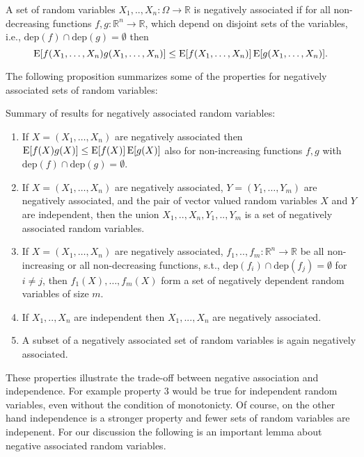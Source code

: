 \begin{definition}\label{def:neg_assoc}
A set of random variables $X_1,..,X_n: \Omega \rightarrow \mathbb R$ is negatively associated if for all non-decreasing functions $f,g: \mathbb R^n \rightarrow \mathbb R$, which depend on disjoint sets of the variables, i.e., $\mathrm{dep}(f) \cap \mathrm{dep}(g) = \emptyset$ then
\[
\operatorname{\mathrm{E}} [f(X_1,\ldots,X_n) g(X_1,\ldots,X_n)] \leq \operatorname{\mathrm{E}} [f(X_1,\ldots,X_n)] \operatorname{\mathrm{E}} [g(X_1,\ldots,X_n)] \textrm{.}
\]
\end{definition}

The following proposition summarizes some of the properties for negatively associated sets of random variables: 
\begin{proposition}\label{pro:neg_dep_props}
Summary of results for negatively associated random variables: 
\begin{enumerate}
\item If $X=(X_1,\ldots,X_n)$ are negatively associated then $\operatorname{\mathrm{E}} [f(X) g(X)] \leq \operatorname{\mathrm{E}} [f(X)] \operatorname{\mathrm{E}} [g(X)]$ also for non-increasing functions $f,g$ with $\mathrm{dep}(f) \cap \mathrm{dep}(g) = \emptyset$.
\item If $X=(X_1,\ldots,X_n)$ are negatively associated, $Y=(Y_1,\ldots,Y_m)$ are negatively associated, and the pair of vector valued random variables $X$ and $Y$ are independent, then the union $X_1,..,X_n,Y_1,..,Y_m$ is a set of negatively associated random variables.
\item If $X=(X_1,\ldots,X_n)$ are negatively associated, $f_1,..,f_m : \mathbb R^n \rightarrow \mathbb R$ be all non-increasing or all non-decreasing functions, s.t., $\mathrm{dep}(f_i) \cap \mathrm{dep}(f_j) = \emptyset$ for $i \neq j$, then $f_1(X),\ldots,f_m(X)$ form a set of negatively dependent random variables of size $m$.
\item If $X_1,..,X_n$ are independent then $X_1,...,X_n$ are negatively associated.
\item A subset of a negatively associated set of random variables is again negatively associated.
\end{enumerate}
\end{proposition}

These properties illustrate the trade-off between negative association and independence.
For example property 3 would be true for independent random variables, even without the condition of monotonicty.
Of course, on the other hand independence is a stronger property and fewer sets of random variables are indepenent.
For our discussion the following is an important lemma about negative associated random variables.

